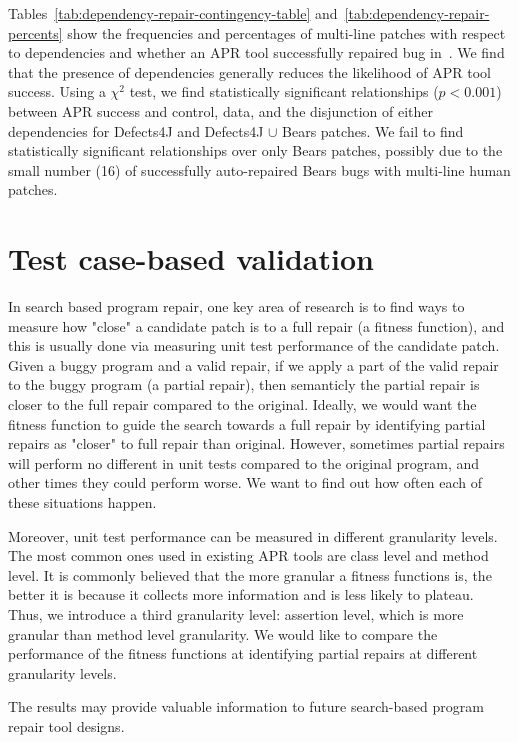 \documentclass[sigconf, timestamp-false, anonymous=true]{acmart}
\begin{document}
Tables~\ref{tab:dependency-repair-contingency-table} and~\ref{tab:dependency-repair-percents}
show the frequencies and percentages of multi-line patches with respect to dependencies 
and whether an APR tool successfully repaired bug in~\cite{durieux-repair-them-all}.
We find that the presence of dependencies generally reduces the likelihood of APR tool success.
Using a $\chi^2$ test, we find statistically significant relationships ($p < 0.001$)
between APR success and control, data, and the disjunction of either dependencies 
for Defects4J and Defects4J $\cup$ Bears patches. We fail to find statistically 
significant relationships over only Bears patches, possibly due to the small number (16) of 
successfully auto-repaired Bears bugs with multi-line human patches.


\section{Test case-based validation}

In search based program repair, one key area of research is to find ways to 
measure how "close" a candidate patch is to a full repair (a fitness function),
and this is usually done via measuring unit test performance of the candidate patch. 
Given a buggy program and a valid repair, if we apply a part of the valid repair to 
the buggy program (a partial repair), then semanticly the partial repair is closer
 to the full repair compared to the original. 
Ideally, we would want the fitness function to guide the search towards a full 
repair by identifying partial repairs as "closer" to full repair than original.
However, sometimes partial repairs will perform no different in unit tests compared 
to the original program, and other times they could perform worse. We want to find 
out how often each of these situations happen.

Moreover, unit test performance can be measured in different granularity levels. 
The most common ones used in existing APR tools are class level and method level. 
It is commonly believed that the more granular a fitness functions is, the better 
it is because it collects more information and is less likely to plateau. Thus, 
we introduce a third granularity level: assertion level, which is more granular 
than method level granularity.
We would like to compare the performance of the fitness functions at identifying 
partial repairs at different granularity levels.

The results may provide valuable information to future search-based program 
repair tool designs.
\end{document}
